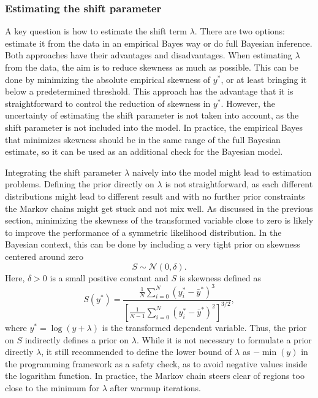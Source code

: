 \subsubsection{Estimating the shift parameter}
A key question is how to estimate the shift term $\lambda$.
There are two options: estimate it from the data in an empirical Bayes way or do full Bayesian inference.
Both approaches have their advantages and disadvantages.
When estimating $\lambda$ from the data, the aim is to reduce skewness as much as possible.
This can be done by minimizing the absolute empirical skewness of $y^*$, or at least bringing it below a predetermined threshold.
This approach has the advantage that it is straightforward to control the reduction of skewness in $y^*$.
However, the uncertainty of estimating the shift parameter is not taken into account, as the shift parameter is not included into the model.
In practice, the empirical Bayes that minimizes skewness should be in the same range of the full Bayesian estimate, so it can be used as an additional check for the Bayesian model.

Integrating the shift parameter $\lambda$ naively into the model might lead to estimation problems.
Defining the prior directly on $\lambda$ is not straightforward, as each different distributions might lead to different result and with no further prior constraints the Markov chains might get stuck and not mix well.
As discussed in the previous section, minimizing the skewness of the transformed variable close to zero is likely to improve the performance of a symmetric likelihood distribution.
In the Bayesian context, this can be done by including a very tight prior on skewness centered around zero
\begin{equation*}
    S \sim \mathcal N(0, \delta).
\end{equation*}
Here, $\delta > 0$ is a small positive constant and $S$ is skewness defined as
\begin{equation*}
    \displaystyle S(y^*) =  \frac{\frac 1 N \sum^{N}_{i = 0} (y_i^* - \bar y^* )^3}
    {\left[ \frac{1}{N - 1} \sum^{N}_{i = 0} (y_i^* - \bar y^* )^2 \right]^{3/2}},
\end{equation*}
where $y^* = \log(y + \lambda)$ is the transformed dependent variable. Thus, the prior on $S$ indirectly defines a prior on $\lambda$.
While it is not necessary to formulate a prior directly $\lambda$, it still recommended to define the lower bound of $\lambda$ as $-\min(y)$ in the programming framework as a safety check, as to avoid negative values inside the logarithm function.
In practice, the Markov chain steers clear of regions too close to the minimum for $\lambda$ after warmup iterations.

